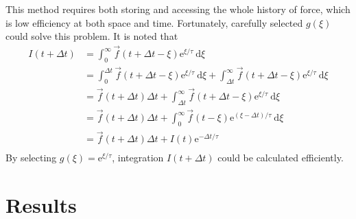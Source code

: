 \documentclass{article}
\newcommand{\lb}{\left(}
\newcommand{\rb}{\right)}
\newcommand{\db}[1]{{\lb {#1} \rb}}
\newcommand{\dd}{{\ \mathrm d}}
\newcommand{\ee}{{\mathrm e}}
\begin{document}
            This method requires both storing and accessing the whole history of force, which is low efficiency at both space and time.
            Fortunately, carefully selected $g\db{\xi}$ could solve this problem. It is noted that
            \begin{equation*}
                \begin{aligned}
                    I\db{t+\Delta t}
                        &=
                            \int_0^\infty \vec{f}\db{t+\Delta t-\xi} \ee^{\xi/\tau} \dd \xi \\
                        &=
                            \int_0^{\Delta t} \vec{f}\db{t+\Delta t-\xi} \ee^{\xi/\tau} \dd \xi
                            +
                            \int_{\Delta t}^\infty \vec{f}\db{t+\Delta t-\xi} \ee^{\xi/\tau} \dd \xi \\
                        &=
                            \vec{f}\db{t+\Delta t} \Delta t
                            +
                            \int_{\Delta t}^\infty \vec{f}\db{t+\Delta t-\xi} \ee^{\xi/\tau} \dd \xi \\
                        &=
                            \vec{f}\db{t+\Delta t} \Delta t
                            +
                            \int_0^\infty \vec{f}\db{t-\xi} \ee^{\db{\xi-\Delta t}/\tau} \dd \xi \\
                        &=
                            \vec{f}\db{t+\Delta t} \Delta t
                            +
                            I\db{t} \ee^{-\Delta t/\tau} \\
                \end{aligned}
            \end{equation*}
            By selecting $g\db{\xi}=\ee^{\xi/\tau}$, integration $I\db{t+\Delta t}$ could be calculated efficiently.
        \section{Results}
\end{document}
